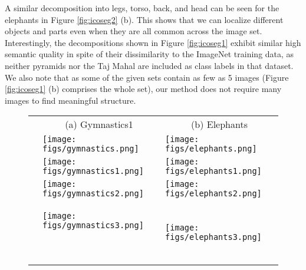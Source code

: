 \documentclass[runningheads]{llncs}
\begin{document}
	A similar decomposition into legs, torso, back, and head can be seen for the elephants in Figure \ref{fig:icoseg2} (b). This shows that we can localize different objects and parts even when they are all common across the image set. Interestingly, the decompositions shown in Figure \ref{fig:icoseg1} exhibit similar high semantic quality in spite of their dissimilarity to the ImageNet training data, as neither pyramids nor the Taj Mahal are included as class labels in that dataset.
	We also note that as some of the given sets contain as few as 5 images (Figure \ref{fig:icoseg1} (b) comprises the whole set), our method does not require many images to find meaningful structure.
	
	
	\begin{figure}[t]
		\setlength{\tabcolsep}{0.8pt}
		\begin{tabular}{lcc}
						& (a) Gymnastics1 & (b) Elephants \\
			& \multicolumn{1}{l|}{\begin{minipage}{0.48\textwidth}\texttt{[image: figs/gymnastics.png]}\end{minipage} }& \multicolumn{1}{l}{\begin{minipage}{0.48\textwidth}\texttt{[image: figs/elephants.png]}\end{minipage}} \\
			
			\rotatebox[origin=c]{90}{\footnotesize}& \multicolumn{1}{l|}{\begin{minipage}{0.48\textwidth}\texttt{[image: figs/gymnastics1.png]}\end{minipage} } & \multicolumn{1}{l}{\begin{minipage}{0.48\textwidth}\texttt{[image: figs/elephants1.png]}\end{minipage}}  \\
			
			\rotatebox[origin=c]{90}{\footnotesize}& \multicolumn{1}{l|}{\begin{minipage}{0.48\textwidth}\texttt{[image: figs/gymnastics2.png]}\end{minipage} } & \multicolumn{1}{l}{\begin{minipage}{0.48\textwidth}\texttt{[image: figs/elephants2.png]}\end{minipage} } \\
			
			\rotatebox[origin=c]{90}{\footnotesize}& \multicolumn{1}{l|}{\begin{minipage}{0.48\textwidth}\texttt{[image: figs/gymnastics3.png]}\end{minipage}~~}  & \multicolumn{1}{l}{\begin{minipage}{0.48\textwidth}\texttt{[image: figs/elephants3.png]}\end{minipage} } \\
			

\end{tabular}
\end{figure}
\end{document}
